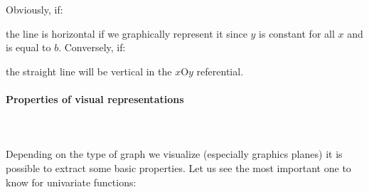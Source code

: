 	Obviously, if:
	
	the line is horizontal if we graphically represent it since $y$ is constant for all $x$ and is equal to $b$. Conversely, if:
	
	the straight line will be vertical in the $x\text{O}y$ referential.
	
	\paragraph{Properties of visual representations}\mbox{}\\\\
	Depending on the type of graph we visualize (especially graphics planes) it is possible to extract some basic properties. Let us see the most important one to know for univariate functions:
	
